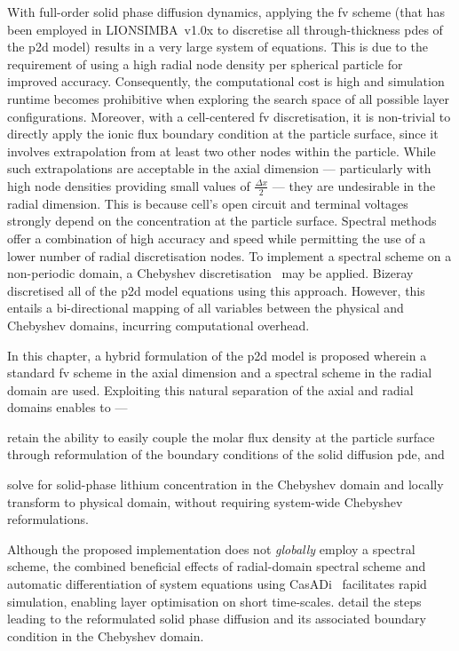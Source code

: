 With full-order  solid phase  diffusion dynamics,  applying the  \gls{fv} scheme
(that has been  employed in LIONSIMBA~v1.0x to  discretise all through-thickness
\gls{pde}s of the \gls{p2d} model) results  in a very large system of equations.
This is due to the requirement of using a high radial node density per spherical
particle for improved accuracy. Consequently, the computational cost is high and
simulation  runtime  becomes prohibitive  when  exploring  the search  space  of
all  possible  layer configurations.  Moreover,  with  a cell-centered  \gls{fv}
discretisation,  it is  non-trivial to  directly apply  the ionic  flux boundary
condition at the particle surface, since it involves extrapolation from at least
two other nodes within the particle. While such extrapolations are acceptable in
the axial  dimension --- particularly  with high node densities  providing small
values of $\frac{\Delta x}{2}$ --- they are undesirable in the radial dimension.
This  is because  cell's  open  circuit and  terminal  voltages strongly  depend
on  the  concentration  at  the  particle  surface.  Spectral  methods  offer  a
combination  of high  accuracy and  speed while  permitting the  use of  a lower
number  of radial  discretisation nodes.  To implement  a spectral  scheme on  a
non-periodic  domain,  a  Chebyshev discretisation~\cite{Trefethen2000}  may  be
applied.  Bizeray~\etal{}~\cite{Bizeray2015} discretised  all  of the  \gls{p2d}
model  equations using  this approach.  However, this  entails a  bi-directional
mapping of all  variables between the physical and  Chebyshev domains, incurring
computational overhead.

In this chapter, a hybrid formulation of the \gls{p2d} model is proposed wherein
a standard \gls{fv} scheme  in the axial dimension and a  spectral scheme in the
radial domain  are used.  Exploiting this  natural separation  of the  axial and
radial domains enables to ---
\begin{enumerate*}[label=\roman*)]
    \item retain  the   ability  to  easily   couple  the   molar  flux  density   at  the particle  surface  through  reformulation  of the  boundary  conditions  of  the solid  diffusion \gls{pde},  and
    \item solve  for  solid-phase  lithium  concentration  in  the  Chebyshev  domain  and locally transform  to physical  domain, without requiring  system-wide Chebyshev reformulations.
\end{enumerate*}
Although the proposed implementation does  not \emph{globally} employ a spectral
scheme, the  combined beneficial  effects of  radial-domain spectral  scheme and
automatic differentiation of system equations using CasADi~\cite{Andersson2013b}
facilitates rapid simulation, enabling  layer optimisation on short time-scales.
   detail  the   steps
leading to  the reformulated solid  phase diffusion and its  associated boundary
condition in the Chebyshev domain.

